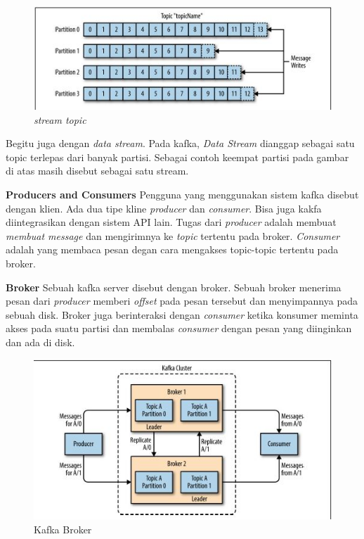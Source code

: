 \documentclass[a4paper,twoside]{article}
\begin{document}
\begin{enumerate}
		\begin{figure}[H] 
		\centering  
		\includegraphics[scale=1]{streamtopic}  
		\caption[Gambar stream topic]{\textit{stream topic}} 
		\label{fig:kafka-stream} 
		\end{figure}

		Begitu juga dengan \textit{data stream}. Pada kafka, \textit{Data Stream} dianggap sebagai 				satu topic terlepas dari banyak partisi. Sebagai contoh keempat partisi pada gambar di atas 			masih disebut sebagai satu stream.
		
		\textbf{Producers and Consumers}\newline
		Pengguna yang menggunakan sistem kafka disebut dengan klien. Ada dua tipe kline 						\textit{producer} dan \textit{consumer}. Bisa juga kakfa diintegrasikan dengan sistem API 				lain. Tugas dari \textit{producer} adalah membuat \textit{membuat message} dan mengirimnya 				ke \textit{topic} tertentu pada broker. \textit{Consumer} adalah yang membaca pesan degan 				cara mengakses topic-topic tertentu pada broker.
		
		\textbf{Broker}\newline
		Sebuah kafka server disebut dengan broker. Sebuah broker menerima pesan dari 							\textit{producer} memberi \textit{offset} pada pesan tersebut dan menyimpannya pada sebuah 				disk. Broker juga berinteraksi dengan \textit{consumer} ketika konsumer meminta akses pada 				suatu partisi dan membalas \textit{consumer} dengan pesan yang diinginkan dan ada di disk.
 
 		\begin{figure}[H] 
		\centering  
		\includegraphics[scale=1]{replikasibroker}  
		\caption[Gambar Kafka Broker]{Kafka Broker} 
		\label{fig:kafka-broker} 
		\end{figure}


\end{enumerate}
\end{document}
